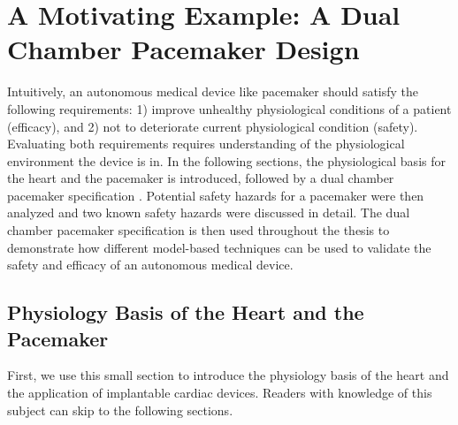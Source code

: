 \chapter{A Motivating Example: A Dual Chamber Pacemaker Design}
Intuitively, an autonomous medical device like pacemaker should satisfy the following requirements: 1) improve unhealthy physiological conditions of a patient (efficacy), and 2) not to deteriorate current physiological condition (safety).
Evaluating both requirements requires understanding of the physiological environment the device is in.
In the following sections, the physiological basis for the heart and the pacemaker is introduced, followed by a dual chamber pacemaker specification \cite{compass}.
Potential safety hazards for a pacemaker were then analyzed and two known safety hazards were discussed in detail.
The dual chamber pacemaker specification is then used throughout the thesis to demonstrate how different model-based techniques can be used to validate the safety and efficacy of an autonomous medical device.
\section{Physiology Basis of the Heart and the Pacemaker}
First, we use this small section to introduce the physiology basis of the heart and the application of implantable cardiac devices. 
Readers with knowledge of this subject can skip to the following sections.
